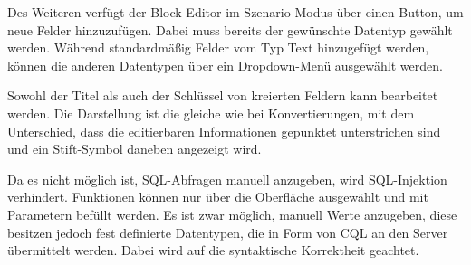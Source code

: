 Des Weiteren verfügt der Block-Editor im Szenario-Modus über einen Button, um neue Felder hinzuzufügen. Dabei muss bereits der gewünschte Datentyp gewählt werden. Während standardmäßig Felder vom Typ Text hinzugefügt werden, können die anderen Datentypen über ein Dropdown-Menü ausgewählt werden.

Sowohl der Titel als auch der Schlüssel von kreierten Feldern kann bearbeitet werden. Die Darstellung ist die gleiche wie bei Konvertierungen, mit dem Unterschied, dass die editierbaren Informationen gepunktet unterstrichen sind und ein Stift-Symbol daneben angezeigt wird.

\pskip
Da es nicht möglich ist, \ac{SQL}-Abfragen manuell anzugeben, wird \ac{SQL}-Injektion verhindert. Funktionen können nur über die Oberfläche ausgewählt und mit Parametern befüllt werden. Es ist zwar möglich, manuell Werte anzugeben, diese besitzen jedoch fest definierte Datentypen, die in Form von \ac{CQL} an den Server übermittelt werden. Dabei wird auf die syntaktische Korrektheit geachtet.
